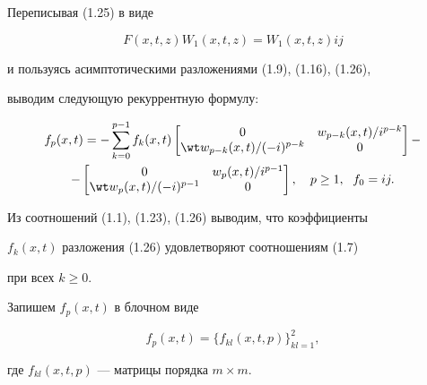 


Переписывая (1.25) в виде 


$$ 


F(x,t,z)W_1(x,t,z)=W_1(x,t,z)ij 


$$ 


и пользуясь асимптотическими разложениями (1.9), (1.16), (1.26), 


выводим следующую рекуррентную формулу: 


\begin{multline} 


f_p(x,t)=-\sum^{p-1}_{k=0}f_k(x,t) 


\begin{bmatrix} 


0 & w_{p-k}(x,t)/i^{p-k}\\ \wt w_{p-k}(x,t)/(-i)^{p-k} & 0 


\end{bmatrix} 


- \\ -


\begin{bmatrix} 


0 & w_p(x,t)/i^{p-1} \\ \wt w_p(x,t)/(-i)^{p-1} & 0 


\end{bmatrix} 


,\quad p\ge 1,\ \; f_0=ij. 


\end{multline} 


Из соотношений (1.1), (1.23), (1.26) выводим, что коэффициенты 


$f_k(x,t)$ разложения (1.26) удовлетворяют соотношениям (1.7) 


при всех $k\ge 0$. 


 


Запишем $f_p(x,t)$ в блочном виде 


$$ 


f_p(x,t)=\{f_{kl}(x,t,p)\}^2_{kl=1}, 


$$ 


где $f_{kl}(x,t,p)$ --- матрицы порядка $m\times m$. 


 


